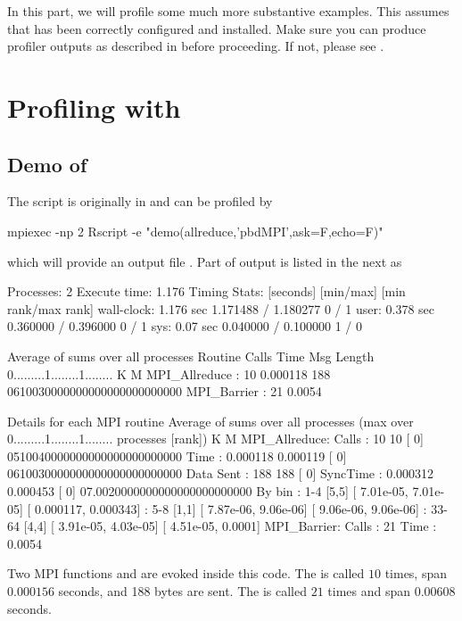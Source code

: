 In this part, we will profile some much more substantive examples.  This assumes that  has been correctly configured and installed.  Make sure you can produce profiler outputs as described in  before proceeding.  If not, please see \instdebug.


\section{Profiling with }
\label{sec:ex_fpmpi}


\subsection{Demo of }

The  script is originally in  and can be profiled
by
\begin{Code}
mpiexec -np 2 Rscript -e "demo(allreduce,'pbdMPI',ask=F,echo=F)"
\end{Code}
which will provide an output file .
Part of output is listed in the next as
\begin{Output}
Processes:      2
Execute time:   1.176
Timing Stats: [seconds] [min/max]       [min rank/max rank]
wall-clock: 1.176 sec 1.171488 / 1.180277     0 / 1
user: 0.378 sec 0.360000 / 0.396000     0 / 1
sys: 0.07 sec  0.040000 / 0.100000     1 / 0

Average of sums over all processes
Routine                 Calls       Time Msg Length    %
0.........1........1........
K        M
MPI_Allreduce       :      10   0.000118        188 0610030000000000000000000000
MPI_Barrier         :      21     0.0054        

Details for each MPI routine
Average of sums over all processes
(max over          0.........1........1........
 processes [rank])           K        M
MPI_Allreduce:
  Calls     :         10           10 [   0] 0510040000000000000000000000
Time      :   0.000118     0.000119 [   0] 0610030000000000000000000000
Data Sent :        188          188 [   0]
SyncTime  :   0.000312     0.000453 [   0] 07.0020000000000000000000000
By bin    : 1-4 [5,5]   [  7.01e-05,  7.01e-05] [  0.000117,  0.000343]
: 5-8 [1,1]   [  7.87e-06,  9.06e-06] [  9.06e-06,  9.06e-06]
: 33-64       [4,4]   [  3.91e-05,  4.03e-05] [  4.51e-05,    0.0001]
MPI_Barrier:
  Calls     :         21
Time      :     0.0054
\end{Output}
Two MPI  functions  and  are
evoked inside this  code. The  is called $10$
  times, span $0.000156$ seconds, and 188 bytes are sent.
The  is called $21$ times and span $0.00608$ seconds.


